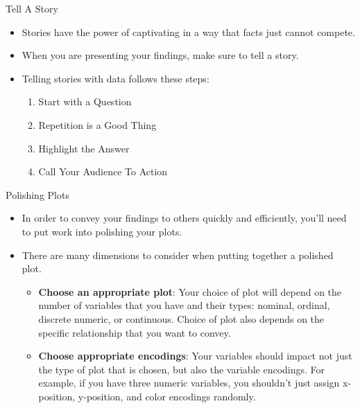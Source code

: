 \documentclass[12pt]{beamer}
\begin{document}
    \begin{frame}{Tell A Story}
    	\begin{itemize}
    		\item Stories have the power of captivating in a way that facts just cannot compete.
    		\item When you are presenting your findings, make sure to tell a story.
    		\item Telling stories with data follows these steps:
    		\begin{enumerate}
    			\item Start with a Question
    			\item Repetition is a Good Thing
    			\item Highlight the Answer
    			\item Call Your Audience To Action
    		\end{enumerate}
    		
    	\end{itemize}
    \end{frame}
    \begin{frame}{Polishing Plots}
    	\begin{itemize}
    		\item  In order to convey your findings to others quickly and efficiently, you'll need to put work into polishing your plots. 
    		\item There are many dimensions to consider when putting together a polished plot.
    		\begin{itemize}
    			\item \textbf{Choose an appropriate plot}: Your choice of plot will depend on the number of variables that you have and their types: nominal, ordinal, discrete numeric, or continuous.  Choice of plot also depends on the specific relationship that you want to convey.
    			\item \textbf{Choose appropriate encodings}: Your variables should impact not just the type of plot that is chosen, but also the variable encodings. For example, if you have three numeric variables, you shouldn't just assign x-position, y-position, and color encodings randomly.
    		\end{itemize}
    	\end{itemize}
    \end{frame}
\end{document}
